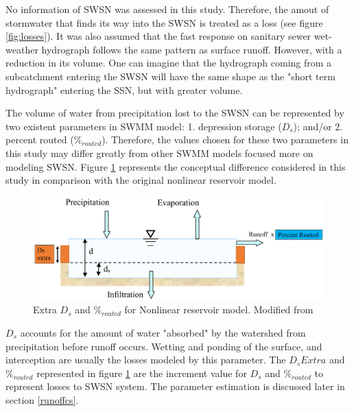 No information of \acf{SWSN} was assessed in this study. Therefore, the amout of stormwater that finds its way into the \ac{SWSN} is treated as a loss (see figure \ref{fig:losses}). It was also assumed that the fast response on sanitary sewer wet-weather hydrograph follows the same pattern as surface runoff. However, with a reduction in its volume. One can imagine that the hydrograph coming from a subcatchment entering the \ac{SWSN} will have the same shape as the "short term hydrograph" entering the \acf{SSN}, but with greater volume. 

The volume of water from precipitation lost to the \ac{SWSN} can be represented by two existent parameters in SWMM model: 1. depression storage ($D_s$); and/or 2. percent routed ($\%_{routed}$). Therefore, the values chosen for these two parameters in this study may differ greatly from other SWMM models focused more on modeling \ac{SWSN}. Figure \ref{fig:runoffreservoirmod} represents the conceptual difference considered in this study in comparison with the original nonlinear reservoir model.


\begin{figure}[ht]
    \centering
	\includegraphics[scale=0.5]{figures/runoffreservoirmod.png}
	\caption{Extra $D_s$ and $\%_{routed}$ for Nonlinear reservoir model. Modified from \citet{Rossman2016}}
	\label{fig:runoffreservoirmod}
\end{figure}

$D_s$ accounts for the amount of water "absorbed" by the watershed from precipitation before runoff occurs. Wetting and ponding of the surface, and interception are usually the losses modeled by this parameter. The $D_s Extra$ and $\%_{routed}$ represented in figure \ref{fig:runoffreservoirmod} are the increment value for $D_s$ and $\%_{routed}$  to represent losses to \ac{SWSN} system. The parameter estimation is discussed later in section \ref{runoffcs}.

